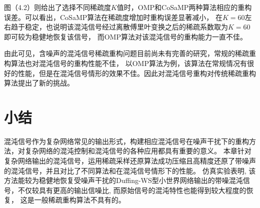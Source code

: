 图（4.2）则给出了选择不同稀疏度$K$值时，OMP和CoSaMP两种算法相应的重构误差。可以看出，CoSaMP算法在稀疏度增加时重构误差显著减小，
在$K = 60$左右趋于稳定，也说明该混沌信号经过离散傅里叶变换之后的稀疏系数取为$K = 60$即可较为稳健地恢复该信号，
而OMP算法对该混沌信号的重构能力一直不佳。\par
由此可见，含噪声的混沌信号稀疏重构问题目前尚未有完善的研究，常规的稀疏重构算法也对混沌信号的重构性能不佳，
以OMP算法为例，该算法在常规情况有很好的性能，但是在混沌信号情形的效果不佳。因此对混沌信号重构对传统稀疏重构算法提出了新的挑战。
\section{小结}
混沌信号作为复杂网络常见的输出形式，构建相应混沌信号在噪声干扰下的重构方法，对复杂网络的混沌控制和混沌信号的各种应用都具有重要的意义。
本章针对复杂网络输出的混沌信号，运用稀疏采样还原算法成功压缩且高精度还原了带噪声的混沌信号，并且对比了不同算法和在混沌信号情形下的性能。
仿真实验表明, 该方法能较为稳健地恢复受噪声干扰的Duffing-WS型小世界网络输出的带噪混沌信号，不仅较具有更高的输出信噪比, 而原始信号的混沌特性也能得到较大程度的恢复，
这是一般稀疏重构算法不具有的。